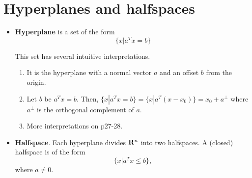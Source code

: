 \documentclass[a4paper, oneside]{book}
\begin{document}
\section{Hyperplanes and halfspaces}
\begin{itemize}
\item \textbf{Hyperplane} is a set of the form $$\{x | a^T x = b\}$$

This set has several intuitive interpretations. 
	\begin{enumerate}
	\item It is the hyperplane with a normal vector $a$ and an offset $b$ from the origin.
	\item Let $b$ be $a^T x = b$. Then, $\{x | a^T x = b\} = \{x | a^T (x-x_0)\} = x_0 + a^\perp$ where $a^\perp$ is the orthogonal complement of $a$.
	\item More interpretations on p27-28.
	\end{enumerate}
\item \textbf{Halfspace}. Each hyperplane divides $\mathbf R^n$ into two halfspaces. A (closed) halfspace is of the form $$\{x | a^T x\le b\},$$
where $a \neq 0$.
\end{itemize}




\end{document}
